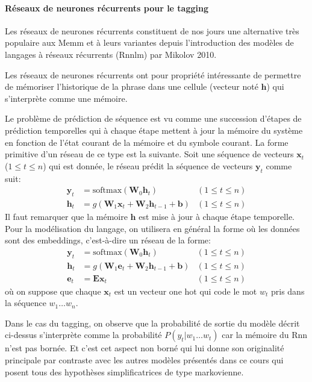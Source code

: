 \documentclass[11pt,openany]{book}
\begin{document}
\paragraph{Réseaux de neurones récurrents pour le tagging} 
Les réseaux de neurones récurrents constituent de nos jours une alternative très
populaire aux {\sc  Memm} et à leurs variantes depuis l'introduction 
des modèles de langages à réseaux récurrents ({\sc Rnnlm}) par  Mikolov 2010. 

Les réseaux de neurones récurrents ont pour propriété intéressante de
permettre de mémoriser l'historique de la phrase dans une cellule
(vecteur noté $\mathbf{h}$) qui s'interprète comme une mémoire. 

Le problème de prédiction de séquence est vu comme une succession
d'étapes de prédiction temporelles qui à chaque étape mettent à jour
la mémoire du système en fonction de l'état courant de la mémoire et
du symbole courant. 
La forme primitive d'un réseau de ce type est la suivante.
Soit une séquence de vecteurs $\mathbf{x}_t$ ($1\leq t \leq n$) qui est
donnée, le réseau prédit la séquence de vecteurs $\mathbf{y}_t$ comme suit:
\begin{align*}
\mathbf{y}_t &= \text{softmax}(\mathbf{W}_0 \mathbf{h}_t)    &(1 \leq t \leq n)\\
\mathbf{h}_t &= g(\mathbf{W}_1\mathbf{x}_t + \mathbf{W}_2  
\mathbf{h}_{t-1}+\mathbf{b} ) &(1 \leq t \leq n)
\end{align*}
Il faut remarquer que la mémoire $\mathbf{h}$ est mise à jour à chaque
étape temporelle. Pour la modélisation du langage, on utilisera en
général la forme où les données sont des embeddings, c'est-à-dire un
réseau de la forme:
\begin{align*}
\mathbf{y}_t &= \text{softmax}(\mathbf{W}_0 \mathbf{h}_t)  &(1 \leq t \leq n)\\
\mathbf{h}_t &= g(\mathbf{W}_1\mathbf{e}_t + \mathbf{W}_2
\mathbf{h}_{t-1}+\mathbf{b} )  &(1 \leq t \leq n)\\
\mathbf{e}_t &= \mathbf{E}\mathbf{x}_t  &(1 \leq t \leq n)
\end{align*}
où on suppose que chaque $\mathbf{x}_t$ est un vecteur one hot qui
code le mot $w_t$ pris dans la séquence $w_1\ldots w_n$.

Dans le cas du tagging, on observe que la probabilité de sortie du
modèle décrit ci-dessus s'interprète comme la probabilité 
$P(y_t | w_1\ldots w_t)$ car la mémoire du {\sc Rnn}
n'est pas bornée.  Et c'est cet aspect non borné qui lui donne son
originalité principale par contraste avec les autres modèles présentés
dans ce cours qui posent tous des hypothèses simplificatrices de type
markovienne.  
\end{document}
